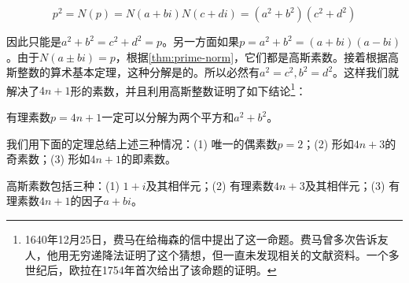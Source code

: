 \documentclass[b5paper]{ctexart}
\begin{document}
\[
p^2 = N(p) = N(a+bi)N(c+di) = (a^2 + b^2)(c^2 + d^2)
\]

因此只能是$a^2 + b^2 = c^2 + d^2 = p$。另一方面如果$p = a^2 + b^2 = (a + bi)(a - bi)$。由于$N(a \pm bi) = p$，根据\cref{thm:prime-norm}，它们都是高斯素数。接着根据高斯整数的算术基本定理，这种分解是的。所以必然有$a^2 = c^2, b^2 = d^2$。这样我们就解决了$4n + 1$形的素数，并且利用高斯整数证明了如下结论\footnote{1640年12月25日，费马在给梅森的信中提出了这一命题。费马曾多次告诉友人，他用无穷递降法证明了这个猜想，但一直未发现相关的文献资料。一个多世纪后，欧拉在1754年首次给出了该命题的证明。}：

\begin{theorem}[费马平方和定理]
有理素数$p = 4n + 1$一定可以分解为两个平方和$a^2 + b^2$。
\end{theorem}

我们用下面的定理总结上述三种情况：(1) 唯一的偶素数$p = 2$；(2) 形如$4n + 3$的奇素数；(3) 形如$4n + 1$的即素数。

\begin{theorem}
高斯素数包括三种：(1) $1 + i$及其相伴元；(2) 有理素数$4n + 3$及其相伴元；(3) 有理素数$4n + 1$的因子$a + bi$。
\end{theorem}
\end{document}
